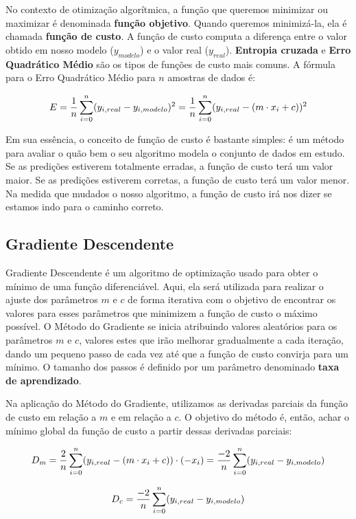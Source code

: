 No contexto de otimização algorítmica, a função que queremos minimizar ou maximizar é denominada \textbf{função objetivo}. Quando queremos minimizá-la, ela é chamada \textbf{função de custo}. A função de custo computa a diferença entre o valor obtido em nosso modelo ($y_{modelo}$) e o valor real ($y_{real}$). \textbf{Entropia cruzada} e \textbf{Erro Quadrático Médio} são os tipos de funções de custo mais comuns. A fórmula para o Erro Quadrático Médio para $n$ amostras de dados é:

\[\large E=\frac{1}{n}\sum_{i=0}^{n}(y_{i,real} - y_{i,modelo})^{2} = \frac{1}{n}\sum_{i=0}^{n}(y_{i,real} - (m \cdot x_{i} + c))^{2}\]

Em sua essência, o conceito de função de custo é bastante simples: é um método para avaliar o quão bem o seu algoritmo modela o conjunto de dados em estudo. Se as predições estiverem totalmente erradas, a função de custo terá um valor maior. Se as predições estiverem corretas, a função de custo terá um valor menor. Na medida que mudados o nosso algoritmo, a função de custo irá nos dizer se estamos indo para o caminho correto.

\subsection{Gradiente Descendente}
Gradiente Descendente é um algoritmo de optimização usado para obter o mínimo de uma função diferenciável. Aqui, ela será utilizada para realizar o ajuste dos parâmetros $m$ e $c$ de forma iterativa com o objetivo de encontrar os valores para esses parâmetros que minimizem a função de custo o máximo possível. O Método do Gradiente se inicia atribuindo valores aleatórios para os parâmetros $m$ e $c$, valores estes que irão melhorar gradualmente a cada iteração, dando um pequeno passo de cada vez até que a função de custo convirja para um mínimo. O tamanho dos passos é definido por um parâmetro denominado \textbf{taxa de aprendizado}.

Na aplicação do Método do Gradiente, utilizamos as derivadas parciais da função de custo em relação a $m$ e em relação a $c$. O objetivo do método é, então, achar o mínimo global da função de custo a partir dessas derivadas parciais:

\[\large D_{m} = \frac{2}{n}\sum_{i=0}^{n}(y_{i,real} - (m \cdot x_{i} + c))\cdot(-x_{i}) = \frac{-2}{n}\sum_{i=0}^{n}(y_{i,real} - y_{i,modelo})\]

\[\large D_{c} = \frac{-2}{n}\sum_{i=0}^{n}(y_{i,real} - y_{i,modelo})\]


